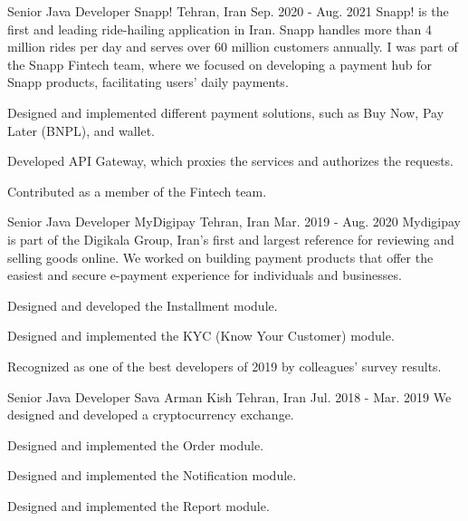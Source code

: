 \begin{cventries}
  \cventry
    {Senior Java Developer} %
    {Snapp!} %
    {Tehran, Iran} %
    {Sep. 2020 - Aug. 2021} %
    {
      Snapp! is the first and leading ride-hailing application in Iran. Snapp handles more than 4 million rides per day and serves over 60 million customers annually. I was part of the Snapp Fintech team, where we focused on developing a payment hub for Snapp products, facilitating users' daily payments.
    }
    {
      \begin{cvitems} %
        \item {Designed and implemented different payment solutions, such as Buy Now, Pay Later (BNPL), and wallet.}
        \item {Developed API Gateway, which proxies the services and authorizes the requests.}
        \item {Contributed as a member of the Fintech team.}
      \end{cvitems}
    }

  \cventry
    {Senior Java Developer} %
    {MyDigipay} %
    {Tehran, Iran} %
    {Mar. 2019 - Aug. 2020} %
    {
      Mydigipay is part of the Digikala Group, Iran's first and largest reference for reviewing and selling goods online. We worked on building payment products that offer the easiest and secure e-payment experience for individuals and businesses.
    }
    {
      \begin{cvitems} %
        \item {Designed and developed the Installment module.}
        \item {Designed and implemented the KYC (Know Your Customer) module.}
        \item {Recognized as one of the best developers of 2019 by colleagues' survey results.}
      \end{cvitems}
    }

  \cventry
    {Senior Java Developer} %
    {Sava Arman Kish} %
    {Tehran, Iran} %
    {Jul. 2018 - Mar. 2019} %
    {
      We designed and developed a cryptocurrency exchange.
    }
    {
      \begin{cvitems} %
        \item {Designed and implemented the Order module.}
        \item {Designed and implemented the Notification module.}
        \item {Designed and implemented the Report module.}
      \end{cvitems}
    }


\end{cventries}
